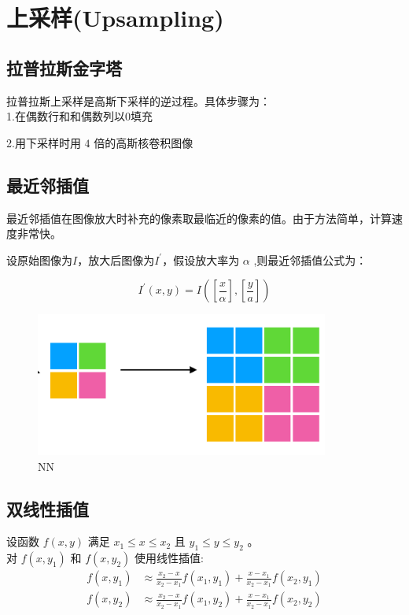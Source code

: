 \documentclass[12pt]{article}
\begin{document}
	\section{上采样(Upsampling)}
	
	\subsection{拉普拉斯金字塔}
	拉普拉斯上采样是高斯下采样的逆过程。具体步骤为：\\
	
	1.在偶数行和和偶数列以0填充
	
	2.用下采样时用 $4$ 倍的高斯核卷积图像
	
	\subsection{最近邻插值}
	最近邻插值在图像放大时补充的像素取最临近的像素的值。由于方法简单，计算速度非常快。
	
	设原始图像为$I$，放大后图像为$I^{\prime}$，假设放大率为 $\alpha$ ,则最近邻插值公式为：
	
	$$
	I^{\prime}(x, y)=I\left(\left[\frac{x}{\alpha}\right],\left[\frac{y}{a}\right]\right)
	$$
	
	\begin{figure}[H]
		\centering
		\includegraphics[width=3.8in]{./nn.png}
		\centering
		\caption{NN}
	\end{figure}

	\subsection{双线性插值}
	
	设函数 $f(x, y)$ 满足 $x_{1} \leq x \leq x_{2}$ 且 $y_{1} \leq y \leq y_{2}$ 。\\ 
	
	
	对 $f\left(x, y_{1}\right)$ 和 $f\left(x, y_{2}\right)$ 使用线性插值:
	$$
	\begin{aligned}
		f\left(x, y_{1}\right) & \approx \frac{x_{2}-x}{x_{2}-x_{1}} f\left(x_{1}, y_{1}\right)+\frac{x-x_{1}}{x_{2}-x_{1}} f\left(x_{2}, y_{1}\right) \\
		f\left(x, y_{2}\right) & \approx \frac{x_{2}-x}{x_{2}-x_{1}} f\left(x_{1}, y_{2}\right)+\frac{x-x_{1}}{x_{2}-x_{1}} f\left(x_{2}, y_{2}\right)
	\end{aligned}
	$$
	
\end{document}
